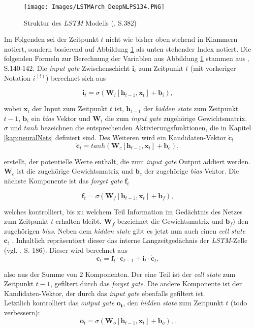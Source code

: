 \documentclass[a4paper,11pt]{article}
\begin{document}
\begin{figure}[!ht]
\begin{center}
\texttt{[image: Images/LSTMArch\_DeepNLPS134.PNG]}
\caption{Struktur des \textit{LSTM} Modells (\cite{deepNLP}, S.382)}
\label{abb:LSTMArch}
\end{center}
\end{figure}

Im Folgenden sei der Zeitpunkt $t$ nicht wie bisher oben stehend in Klammern notiert, sondern basierend auf Abbildung \ref{abb:LSTMArch} als unten stehender Index notiert. Die folgenden Formeln zur Berechnung der Variablen aus Abbildung \ref{abb:LSTMArch} stammen aus \cite{deepNLP}, S.140-142.
Die \textit{input gate} Zwischenschicht $\bm{i}_t$ zum Zeitpunkt $t$ (mit vorheriger Notation $i^{(t)}$)  berechnet sich aus

\[ \bm{i}_t = \sigma(\bm{W}_i [\bm{h}_{t-1}, \bm{x}_t] + \bm{b}_i),\]

wobei $\bm{x}_t$ der Input zum Zeitpunkt $t$ ist, $\bm{h}_{t-1}$ der \textit{hidden state} zum Zeitpunkt $t-1$, $\bm{b}_i$ ein \textit{bias} Vektor und $\bm{W}_i$ die zum \textit{input gate} zugehörige Gewichtsmatrix. $\sigma$ und $tanh$ bezeichnen die entsprechenden Aktivierungsfunktionen, die in Kapitel \ref{kap:neuralNets} definiert sind. Des Weiteren wird ein Kandidaten-Vektor $\bm{\acute{c}}_t$ 
\[\bm{\acute{c}}_t = tanh(\bm{W}_c [\bm{h}_{t-1}, \bm{x}_t] + \bm{b}_c),\]

erstellt, der potentielle Werte enthält, die zum \textit{input gate} Output addiert werden. $\bm{W}_c$ ist die zugehörige Gewichtsmatrix und $\bm{b}_c$ der zugehörige \textit{bias} Vektor. Die nächste Komponente ist das \textit{forget gate} $\bm{f}_t$

\[  \bm{f}_t = \sigma(\bm{W}_f [\bm{h}_{t-1}, \bm{x}_t] + \bm{b}_f), \]

welches kontrolliert, bis zu welchem Teil Information im Gedächtnis des Netzes zum Zeitpunkt $t$ erhalten bleibt. $\bm{W}_f$ bezeichnet die Gewichtsmatrix und $\bm{b}_f)$ den zugehörigen \textit{bias}. Neben dem \textit{hidden state} gibt es jetzt nun auch einen \textit{cell state} $\bm{c}_t$ . Inhaltlich repräsentiert dieser das interne Langzeitgedächnis der \textit{LSTM}-Zelle (vgl. \cite{keras}, S. 186). Dieser wird berechnet aus
\[\bm{c}_t = \bm{f}_t \cdot \bm{c}_{t-1} + \bm{i}_t \cdot \bm{\acute{c}}_t ,\]

also aus der Summe von $2$ Komponenten. Der eine Teil ist der \textit{cell state} zum Zeitpunkt $t-1$, gefiltert durch das \textit{forget gate}. Die andere Komponente ist der Kandidaten-Vektor, der durch das \textit{input gate} ebenfalls gefiltert ist.\\
Letztlich kontrolliert das \textit{output gate} $\bm{o_t}$, den \textit{hidden state} zum Zeitpunkt $t$ (todo verbessern):
\[  \bm{o}_t = \sigma(\bm{W}_o [\bm{h}_{t-1}, \bm{x}_t] + \bm{b}_o), .\]
\end{document}
